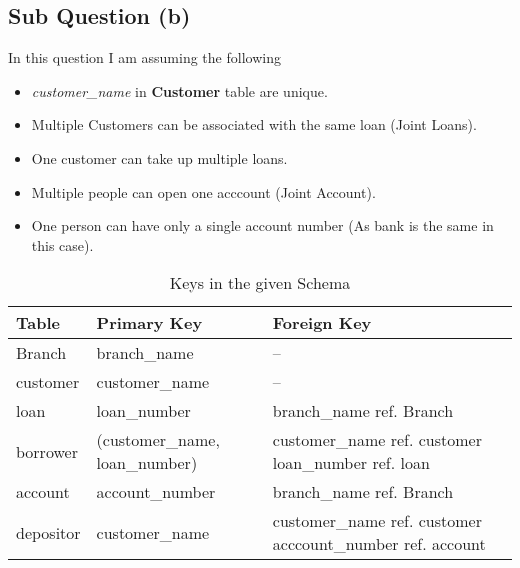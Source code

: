 \documentclass{article}
\begin{document}
\newpage
\subsection{Sub Question (b)}
In this question I am assuming the following

\begin{itemize}
  \item \textit{customer\_name} in \textbf{Customer} table are unique.
  \item Multiple Customers can be associated with the same loan (Joint Loans).
  \item One customer can take up multiple loans. 
  \item Multiple people can open one acccount (Joint Account).
  \item One person can have only a single account number (As bank is the same in this case).
\end{itemize}

  \begin{table}[ht]
    \centering
    \begin{center}
    \begin{tabular}{||C{3cm}||C{3cm}||C{3cm}||}
    \hline  
    \hline
    \textbf{Table} & \textbf{Primary Key}  & \textbf{Foreign Key}\\
    \hline \hline

    Branch & branch\_name  & -- \\
    \hline \hline

    customer & customer\_name  & -- \\
    \hline \hline

    loan & loan\_number  & branch\_name ref. Branch \\
    \hline \hline

    borrower & (customer\_name, loan\_number)  & customer\_name ref. customer loan\_number ref. loan \\
    \hline \hline

    account & account\_number  & branch\_name ref. Branch \\
    \hline \hline

    depositor & customer\_name  & customer\_name ref. customer acccount\_number ref. account \\
    \hline \hline

    \end{tabular}
  \end{center}
  \caption{Keys in the given Schema}
  \end{table}
\end{document}
